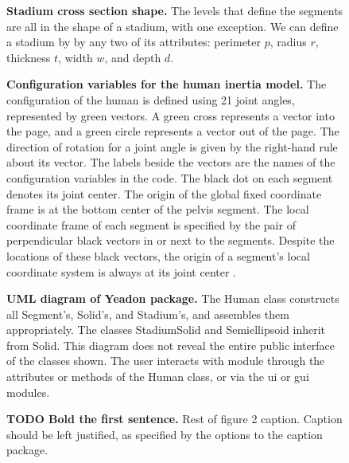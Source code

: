 \documentclass[10pt]{article}
\begin{document}
\begin{figure}[!ht]
\begin{center}
\end{center}
\caption{
{\bf Stadium cross section shape.}  The levels that define the segments are all
in the shape of a stadium, with one exception. We can define a stadium by
by any two of its attributes: perimeter $p$, radius $r$, thickness $t$,  width
$w$, and depth $d$.
}
\label{fig:stadium}
\end{figure}

\begin{figure}[!ht]
\begin{center}
\end{center}
\caption{
{\bf Configuration variables for the human inertia model.}  The configuration
of the human is defined using 21 joint angles, represented by green vectors. A
green cross represents a vector into the page, and a
green circle represents a vector out of the page. The direction of rotation for
a joint angle is given by the right-hand rule about its vector. The labels
beside the vectors are the names of the configuration variables in the code.
The black dot on each segment denotes its joint center. The origin of the
global fixed coordinate frame is at the bottom center of the
pelvis segment. The local coordinate frame of each segment is specified by the
pair of perpendicular black vectors in or next to the segments. Despite the
locations of these black vectors, the origin of a segment's local coordinate
system is always at its joint center \cite{Yeadon1990e}.
}
\label{fig:config}
\end{figure}

\begin{figure}[!ht]
\begin{center}
\end{center}
\caption{
{\bf UML diagram of Yeadon package.}  The Human class constructs all
Segment's, Solid's, and Stadium's, and assembles them
appropriately. The classes StadiumSolid and Semiellipsoid inherit
from Solid. This diagram does not reveal the entire public interface of
the classes shown. The user interacts with module through the attributes or
methods of the Human class, or via the ui or gui modules.
}
\label{fig:umldiagram}
\end{figure}

\begin{figure}[!ht]
\begin{center}
\end{center}
\caption{
{\bf TODO Bold the first sentence.}  Rest of figure 2  caption.  Caption 
should be left justified, as specified by the options to the caption 
package.
}
\label{fig:femaledefault}
\end{figure}
\end{document}
